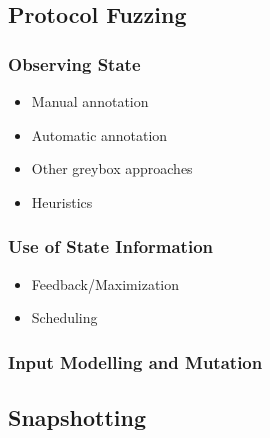 \documentclass{article}
\begin{document}
\begin{multicols}{2}
  \subsection{Protocol Fuzzing}
  \subsubsection{Observing State}
  \begin{itemize}
    \item Manual annotation
    \item Automatic annotation
    \item Other greybox approaches
    \item Heuristics
  \end{itemize}

  \subsubsection{Use of State Information}
  \begin{itemize}
    \item Feedback/Maximization
    \item Scheduling
  \end{itemize}

  \subsubsection{Input Modelling and Mutation}


  \subsection{Snapshotting}



\end{multicols}
\end{document}
